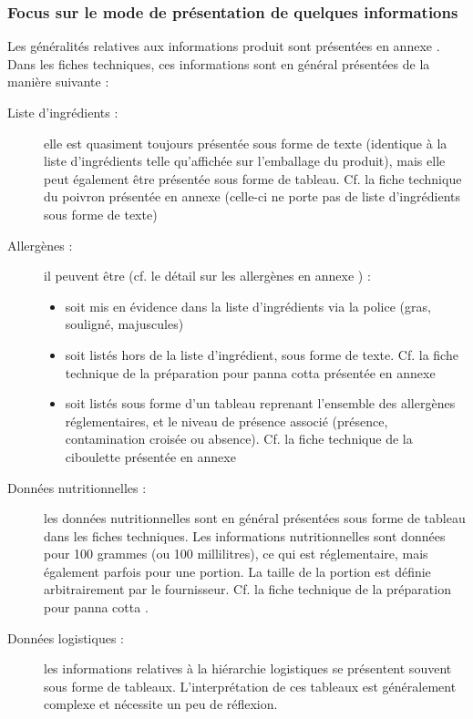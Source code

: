                 \subsubsection{Focus sur le mode de présentation de quelques informations}

            Les généralités relatives aux informations produit sont présentées en annexe .
            Dans les fiches techniques, ces informations sont en général présentées de la manière suivante :
            \begin{description}
                \item[Liste d'ingrédients : ] elle est quasiment toujours présentée sous forme de texte (identique à la liste d'ingrédients telle qu'affichée sur l'emballage du produit), mais elle peut également être présentée sous forme de tableau. Cf. la fiche technique du poivron présentée en annexe  (celle-ci ne porte pas de liste d'ingrédients sous forme de texte)
                \item[Allergènes : ] il peuvent être (cf. le détail sur les allergènes en annexe ) :
                \begin{itemize}
                    \item soit mis en évidence dans la liste d'ingrédients via la police (gras, souligné, majuscules)
                    \item soit listés hors de la liste d'ingrédient, sous forme de texte. Cf. la fiche technique de la préparation pour panna cotta présentée en annexe 
                    \item soit listés sous forme d'un tableau reprenant l'ensemble des allergènes réglementaires, et le niveau de présence associé (présence, contamination croisée ou absence). Cf. la fiche technique de la ciboulette présentée en annexe 
                \end{itemize}
                \item[Données nutritionnelles : ] les données nutritionnelles sont en général présentées sous forme de tableau dans les fiches techniques. Les informations nutritionnelles sont données pour 100 grammes (ou 100 millilitres), ce qui est réglementaire, mais également parfois pour une portion. La taille de la portion est définie arbitrairement par le fournisseur.
                Cf. la fiche technique de la préparation pour panna cotta .
                \item[Données logistiques : ] les informations relatives à la hiérarchie logistiques se présentent souvent sous forme de tableaux.
                L'interprétation de ces tableaux est généralement complexe et nécessite un peu de réflexion.
            \end{description}
            
